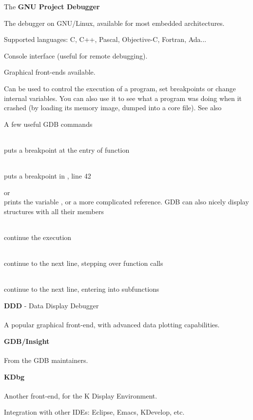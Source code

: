     The {\bf GNU Project Debugger}\\
    \startitemize
    \item The debugger on GNU/Linux, available for most embedded
      architectures.
    \item Supported languages: C, C++, Pascal, Objective-C, Fortran,
      Ada...
    \item Console interface (useful for remote debugging).
    \item Graphical front-ends available.
    \item Can be used to control the execution of a program, set
      breakpoints or change internal variables. You can also use it to
      see what a program was doing when it crashed (by loading its
      memory image, dumped into a core file).
    \stopitemize
    See also 

  \startitemize
  \item A few useful GDB commands
    \startitemize
    \item {}\\
      puts a breakpoint at the entry of function 
    \item {}\\
      puts a breakpoint in , line 42
    \item {} or \\
      prints the variable , or a more complicated reference. GDB
      can also nicely display structures with all their members
    \item {}\\
      continue the execution
    \item {}\\
      continue to the next line, stepping over function calls
    \item {}\\
      continue to the next line, entering into subfunctions
    \stopitemize
  \stopitemize

  \startitemize
  \item {\bf DDD} - Data Display Debugger\\
    \\
    A popular graphical front-end, with advanced data plotting
    capabilities.
  \item {\bf GDB/Insight}\\
    \\
    From the GDB maintainers.
  \item {\bf KDbg}\\
    \\
    Another front-end, for the K Display Environment.
  \item Integration with other IDEs: Eclipse, Emacs, KDevelop, etc.\\
  \stopitemize


